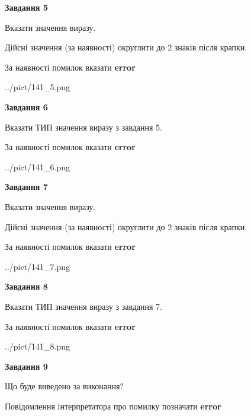 \documentclass[11pt, ukrainian]{article}
\begin{document}
{\begin {large}
{\begin {center}\textbf{Завдання 5}\end {center}}\par
Вказати значення виразу. \par
Дійсні значення (за наявності) округлити до 2 знаків після крапки. \par
За наявності помилок вказати \textbf{error}

\begin{center}
	{../pict/141_5.png}
\end{center}
\newpage

{\begin {center}\textbf{Завдання 6}\end {center}}\par
Вказати ТИП значення виразу з завдання 5. \par
За наявності помилок вказати \textbf{error}

\begin{center}
	{../pict/141_6.png}
\end{center}
\newpage

{\begin {center}\textbf{Завдання 7}\end {center}}\par
Вказати значення виразу. \par
Дійсні значення (за наявності) округлити до 2 знаків після крапки. \par
За наявності помилок вказати \textbf{error}

\begin{center}
	{../pict/141_7.png}
\end{center}
\newpage

{\begin {center}\textbf{Завдання 8}\end {center}}\par
Вказати ТИП значення виразу з завдання 7. \par
За наявності помилок вказати \textbf{error}

\begin{center}
	{../pict/141_8.png}
\end{center}
\newpage

{\begin {center}\textbf{Завдання 9}\end {center}}\par
Що буде виведено за виконання? \par
Повідомлення інтерпретатора про помилку позначати \textbf{error}


\end{large}}
\end{document}
